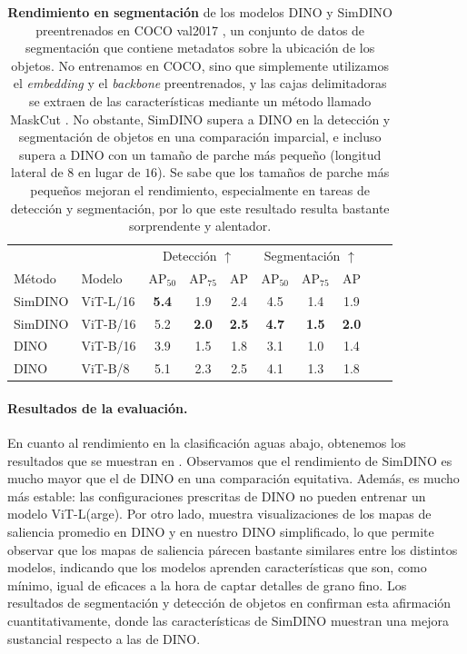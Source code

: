 \documentclass[../../book-main_es.tex]{subfiles}
\begin{document}
\begin{table}
\caption{\small\textbf{Rendimiento en segmentación} de los modelos DINO
    y SimDINO preentrenados en COCO val2017 \citep{lin2014microsoft}, un
    conjunto de datos de segmentación que contiene metadatos sobre la ubicación de los objetos. No
    entrenamos en COCO, sino que simplemente utilizamos el \textit{embedding} y el
    \textit{backbone} preentrenados, y las cajas delimitadoras se extraen de las características mediante
    un método llamado MaskCut \citep{wang2023cut}. No obstante, SimDINO
    supera a DINO en la detección y segmentación de objetos en una comparación
    imparcial, e incluso supera a DINO con un tamaño de parche más pequeño (longitud lateral
    de \(8\) en lugar de \(16\)). Se sabe que los tamaños de parche más pequeños
    mejoran el rendimiento, especialmente en tareas de detección y segmentación,
por lo que este resultado resulta bastante sorprendente y alentador.}
\centering
\begin{tabular}{@{}llcccccccc@{}}
    \toprule
    &  & \multicolumn{3}{c}{Detección $\uparrow$} &
    \multicolumn{3}{c}{Segmentación $\uparrow$} \\
    Método & Modelo & AP$_{50}$  & AP$_{75}$ & AP & AP$_{50}$ &
    AP$_{75}$ & AP  \\
    \midrule
    SimDINO &ViT-L/16 &\bf 5.4 &1.9 &2.4 &4.5 &1.4 &1.9 \\
    SimDINO &ViT-B/16 &5.2 & \bf 2.0 & \bf 2.5 & \bf4.7 & \bf 1.5 & \bf 2.0 \\
    DINO &ViT-B/16 &3.9 &1.5 &1.8 &3.1 &1.0 &1.4 \\
    \midrule
    \color{gray} DINO & \color{gray} ViT-B/8 & \color{gray}5.1 &
    \color{gray}2.3 & \color{gray}2.5 & \color{gray}4.1 &
    \color{gray}1.3 & \color{gray}1.8 \\
    \bottomrule
\end{tabular}
\label{tab:dino_segmentation}
\end{table}

\paragraph{Resultados de la evaluación.} En cuanto al rendimiento en la clasificación aguas abajo,
obtenemos los resultados que se muestran en
. Observamos que el
rendimiento de SimDINO es mucho mayor que el de DINO en una comparación
equitativa. Además, es mucho más estable: las configuraciones prescritas de
DINO no pueden entrenar un modelo ViT-L(arge). Por otro lado,
 muestra visualizaciones de los
mapas de saliencia promedio en DINO y en nuestro DINO simplificado, lo que permite observar que
los mapas de saliencia párecen bastante similares entre los distintos modelos, indicando que
los modelos aprenden características que son, como mínimo, igual de eficaces a la hora de captar
detalles de grano fino. Los resultados de segmentación y detección de objetos
en  confirman esta afirmación
cuantitativamente, donde las características de SimDINO muestran una mejora sustancial
respecto a las de DINO.
\end{document}
